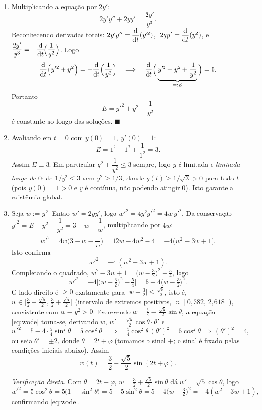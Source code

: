 \begin{enumerate}[label=(\alph*)]

\item Multiplicando a equação por $2y'$:
\[
2y'y''+2yy'=\frac{2y'}{y^3}.
\]
Reconhecendo derivadas totais: $2y'y''=\dfrac{\mathrm{d}}{\mathrm{d} t}(y'^2)$, $\;2yy'=\dfrac{\mathrm{d}}{\mathrm{d} t}(y^2)$, e $\dfrac{2y'}{y^3}=-\dfrac{\mathrm{d}}{\mathrm{d} t}\!\Big(\dfrac1{y^2}\Big)$. Logo
\[
\frac{\mathrm{d}}{\mathrm{d} t}\Big(y'^2+y^2\Big)=-\frac{\mathrm{d}}{\mathrm{d} t}\Big(\frac1{y^2}\Big)
\quad\Longrightarrow\quad
\frac{\mathrm{d}}{\mathrm{d} t}\Big(\underbrace{y'^2+y^2+\frac1{y^2}}_{=:E}\Big)=0 .
\]
Portanto
\[
E=y'^2+y^2+\frac1{y^2}
\]
é constante ao longo das soluções. \qquad$\blacksquare$

\item Avaliando em $t=0$ com $y(0)=1,\ y'(0)=1$:
\[
E=1^2+1^2+\frac1{1^2}=3 .
\]
Assim $E\equiv3$. Em particular $y^2+\dfrac1{y^2}\le3$ sempre, logo $y$ é limitada e \emph{limitada longe de $0$}: de $1/y^2\le3$ vem $y^2\ge1/3$, donde $y(t)\ge 1/\sqrt3>0$ para todo $t$ (pois $y(0)=1>0$ e $y$ é contínua, não podendo atingir $0$). Isto garante a existência global.

\item Seja $w:=y^2$. Então $w'=2yy'$, logo $w'^2=4y^2y'^2=4w\,y'^2$. Da conservação $y'^2=E-y^2-\dfrac1{y^2}=3-w-\dfrac1w$, multiplicando por $4w$:
\[
w'^2=4w\Big(3-w-\frac1w\Big)=12w-4w^2-4=-4\big(w^2-3w+1\big).
\]
Isto confirma
\begin{equation}\label{eq:wode}
w'^2=-4\,(w^2-3w+1).
\end{equation}
Completando o quadrado, $w^2-3w+1=\big(w-\tfrac32\big)^2-\tfrac54$, logo
\[
w'^2=-4\Big[\big(w-\tfrac32\big)^2-\tfrac54\Big]=5-4\big(w-\tfrac32\big)^2 .
\]
O lado direito é $\ge0$ exatamente para $\big|w-\tfrac32\big|\le\tfrac{\sqrt5}{2}$, isto é, $w\in\big[\tfrac32-\tfrac{\sqrt5}{2},\,\tfrac32+\tfrac{\sqrt5}{2}\big]$ (intervalo de extremos positivos, $\approx[0{,}382,\,2{,}618]$), consistente com $w=y^2>0$. Escrevendo $w-\tfrac32=\tfrac{\sqrt5}{2}\sin\theta$, a equação \eqref{eq:wode} torna-se, derivando $w$, $w'=\tfrac{\sqrt5}{2}\cos\theta\cdot\theta'$ e
\[
w'^2=5-4\cdot\tfrac54\sin^2\theta=5\cos^2\theta\quad\Rightarrow\quad \tfrac54\cos^2\theta\,(\theta')^2=5\cos^2\theta\ \Rightarrow\ (\theta')^2=4 ,
\]
ou seja $\theta'=\pm2$, donde $\theta=2t+\varphi$ (tomamos o sinal $+$; o sinal é fixado pelas condições iniciais abaixo). Assim
\[
w(t)=\frac32+\frac{\sqrt5}{2}\sin(2t+\varphi).
\]

\emph{Verificação direta.} Com $\theta=2t+\varphi$, $w=\tfrac32+\tfrac{\sqrt5}{2}\sin\theta$ dá $w'=\sqrt5\cos\theta$, logo
\[
w'^2=5\cos^2\theta=5\big(1-\sin^2\theta\big)=5-5\sin^2\theta=5-4\big(w-\tfrac32\big)^2=-4(w^2-3w+1),
\]
confirmando \eqref{eq:wode}.


\end{enumerate}
